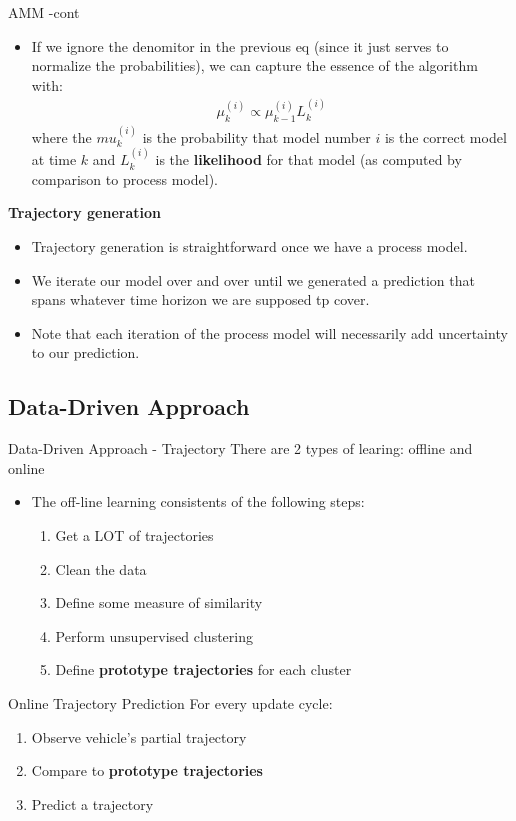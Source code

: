 \documentclass[10pt,mathserif]{beamer}
\begin{document}
\begin{frame}{AMM -cont}
\begin{itemize}
\item If we ignore the denomitor in the previous eq (since it just serves to normalize the probabilities), we can capture the essence of the algorithm with:
\begin{align}
\mu_k^{(i)} \propto \mu_{k-1}^{(i)}L_k^{(i)} 
\end{align}
where the $mu_k^{(i)}$ is the probability that model number $i$ is the correct model at time $k$ and 
$L_k^{(i)}$ is the \textbf{likelihood} for that model (as computed by comparison to process model).
\end{itemize}
\textbf{Trajectory generation}
\begin{itemize}
\item Trajectory generation is straightforward once we have a process model.
\item We iterate our model over and over until we generated a prediction that spans whatever
time horizon we are supposed tp cover.
\item Note that each iteration of the process model will necessarily add uncertainty to our prediction.
\end{itemize}
\end{frame}

\subsection{Data-Driven Approach}
\begin{frame}{Data-Driven Approach - Trajectory}
There are 2 types of learing: offline and online
\begin{itemize}
\item The off-line learning consistents of the following steps:
\begin{enumerate}
\item Get a LOT of trajectories
\item Clean the data
\item Define some measure of similarity
\item Perform unsupervised clustering
\item Define \textbf{prototype trajectories} for each cluster
\end{enumerate}
\end{itemize}
\end{frame}

\begin{frame}{Online Trajectory Prediction}
For every update cycle:
\begin{enumerate}
\item Observe vehicle's partial trajectory
\item Compare to \textbf{prototype trajectories}
\item Predict a trajectory
\end{enumerate}
\end{frame}
\end{document}
